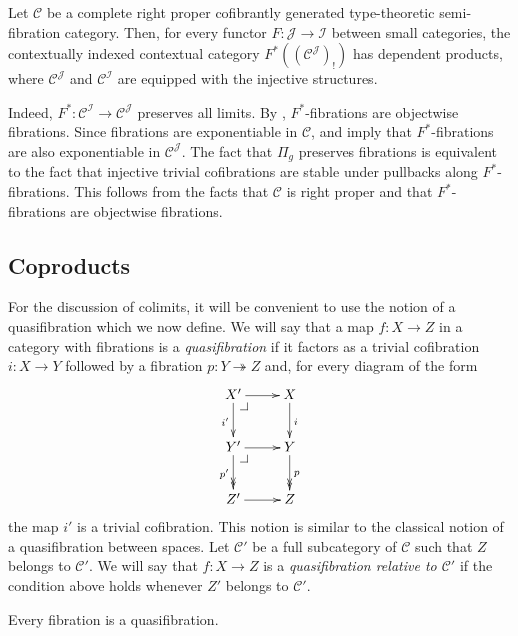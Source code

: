 \documentclass[reqno]{amsart}
\makeatletter
\theoremstyle{definition}
\theoremstyle{remark}
\newcommand{\scat}[1]{\mathcal{#1}}
\numberwithin{figure}{section}
\newcommand{\pb}[1][dr]{\save*!/#1-1.2pc/#1:(-1,1)@^{|-}\restore}
\makeatother
\begin{document}
\begin{example}[products]
Let $\scat{C}$ be a complete right proper cofibrantly generated type-theoretic semi-fibration category.
Then, for every functor $F : \scat{J} \to \scat{I}$ between small categories, the contextually indexed contextual category $F^*((\scat{C}^\scat{J})_!)$ has dependent products,
where $\scat{C}^\scat{J}$ and $\scat{C}^\scat{I}$ are equipped with the injective structures.

Indeed, $F^* : \scat{C}^\scat{I} \to \scat{C}^\scat{J}$ preserves all limits.
By , $F^*$-fibrations are objectwise fibrations.
Since fibrations are exponentiable in $\scat{C}$, \cite[Theorem~2.12]{comp-fact-tor} and \cite[Corollary~2.6]{comp-fact-tor} imply that $F^*$-fibrations are also exponentiable in $\scat{C}^\scat{J}$.
The fact that $\Pi_g$ preserves fibrations is equivalent to the fact that injective trivial cofibrations are stable under pullbacks along $F^*$-fibrations.
This follows from the facts that $\scat{C}$ is right proper and that $F^*$-fibrations are objectwise fibrations.
\end{example}

\subsection{Coproducts}

For the discussion of colimits, it will be convenient to use the notion of a quasifibration which we now define.
We will say that a map $f : X \to Z$ in a category with fibrations is a \emph{quasifibration} if it factors as a trivial cofibration $i : X \to Y$ followed by a fibration $p : Y \twoheadrightarrow Z$ and, for every diagram of the form
\[ \xymatrix{ X' \ar[r] \ar[d]_{i'} \pb         & X \ar[d]^i \\
              Y' \ar[r] \ar@{->>}[d]_{p'} \pb   & Y \ar@{->>}[d]^p \\
              Z' \ar[r]                         & Z
            } \]
the map $i'$ is a trivial cofibration.
This notion is similar to the classical notion of a quasifibration between spaces.
Let $\scat{C}'$ be a full subcategory of $\scat{C}$ such that $Z$ belongs to $\scat{C}'$.
We will say that $f : X \to Z$ is a \emph{quasifibration relative to $\scat{C}'$} if the condition above holds whenever $Z'$ belongs to $\scat{C}'$.

\begin{example}
Every fibration is a quasifibration.
\end{example}
\end{document}
